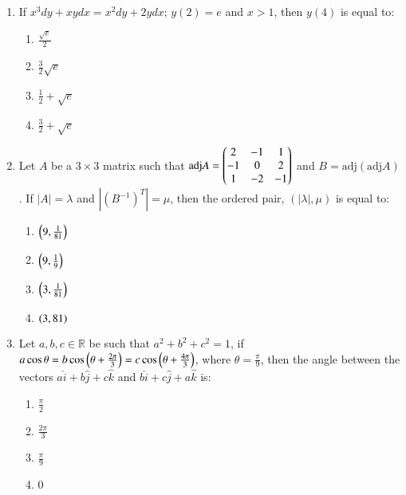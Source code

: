 \documentclass[journal,9pt,twocolumn]{IEEEtran}
\begin{document}
\begin{enumerate}
    \item  If $x^3dy + xydx = x^2dy + 2ydx$; $y(2) = e$ and $x > 1$, then $y(4)$ is equal to:
        
        \begin{multicols}{4}
\begin{enumerate}
    \item $\frac{\sqrt{e}}{2}$
    \item $\frac{3}{2} \sqrt{e}$
    \item $\frac{1}{2} + \sqrt{e}$
    \item $\frac{3}{2} + \sqrt{e}$
\end{enumerate}
\end{multicols}

\item Let $A$ be a $3 \times 3$ matrix such that $\text{adj} A = \begin{pmatrix}2 &-1& 1\\-1& 0& 2\\1& -2& -1\end{pmatrix}$ 
and $B = \text{adj}(\text{adj}  A)$. If $|A| = \lambda$ and $|(B^{-1})^T| = \mu$, then the ordered pair, $(|\lambda|, \mu)$ is equal to:

        \begin{multicols}{2}

\begin{enumerate}
    \item $\left(9, \frac{1}{81}\right)$
    \item $\left(9, \frac{1}{9}\right)$
    \item $\left(3, \frac{1}{81}\right)$
    \item $\left(3, 81\right)$
\end{enumerate}
\end{multicols}

\item Let $a, b, c \in \mathbb{R}$ be such that $a^2 + b^2 + c^2 = 1$, if $a \cos \theta = b \cos\left(\theta + \frac{2\pi}{3}\right) = c \cos\left(\theta + \frac{4\pi}{3}\right)$, where $\theta = \frac{\pi}{9}$, then the angle between the vectors $a\hat{i} + b\hat{j} + c\hat{k}$ and $b\hat{i} + c\hat{j}+ a\hat{k} $ is:
        \begin{multicols}{4}

\begin{enumerate}
    \item $\frac{\pi}{2}$
    \item $\frac{2\pi}{3}$
    \item $\frac{\pi}{9}$
    \item $0$
\end{enumerate}
\end{multicols}


\end{enumerate}
\end{document}
